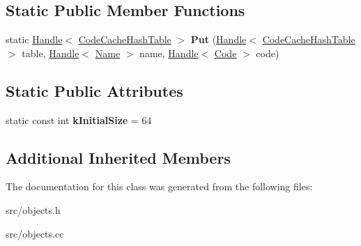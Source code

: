 \subsection*{Static Public Member Functions}
\begin{DoxyCompactItemize}
\item 
\hypertarget{classv8_1_1internal_1_1_code_cache_hash_table_a7e3d0aee89a7456b78ce953c1209cc70}{}static \hyperlink{classv8_1_1internal_1_1_handle}{Handle}$<$ \hyperlink{classv8_1_1internal_1_1_code_cache_hash_table}{Code\+Cache\+Hash\+Table} $>$ {\bfseries Put} (\hyperlink{classv8_1_1internal_1_1_handle}{Handle}$<$ \hyperlink{classv8_1_1internal_1_1_code_cache_hash_table}{Code\+Cache\+Hash\+Table} $>$ table, \hyperlink{classv8_1_1internal_1_1_handle}{Handle}$<$ \hyperlink{classv8_1_1internal_1_1_name}{Name} $>$ name, \hyperlink{classv8_1_1internal_1_1_handle}{Handle}$<$ \hyperlink{classv8_1_1internal_1_1_code}{Code} $>$ code)\label{classv8_1_1internal_1_1_code_cache_hash_table_a7e3d0aee89a7456b78ce953c1209cc70}

\end{DoxyCompactItemize}
\subsection*{Static Public Attributes}
\begin{DoxyCompactItemize}
\item 
\hypertarget{classv8_1_1internal_1_1_code_cache_hash_table_a5b69b933f2a8fb5726b8bd88e309dadf}{}static const int {\bfseries k\+Initial\+Size} = 64\label{classv8_1_1internal_1_1_code_cache_hash_table_a5b69b933f2a8fb5726b8bd88e309dadf}

\end{DoxyCompactItemize}
\subsection*{Additional Inherited Members}


The documentation for this class was generated from the following files\+:\begin{DoxyCompactItemize}
\item 
src/objects.\+h\item 
src/objects.\+cc\end{DoxyCompactItemize}
